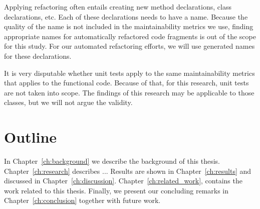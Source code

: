 Applying refactoring often entails creating new method declarations, class declarations, etc. Each of these declarations needs to have a name. Because the quality of the name is not included in the maintainability metrics we use, finding appropriate names for automatically refactored code fragments is out of the scope for this study. For our automated refactoring efforts, we will use generated names for these declarations.

It is very disputable whether unit tests apply to the same maintainability metrics that applies to the functional code. Because of that, for this research, unit tests are not taken into scope. The findings of this research may be applicable to those classes, but we will not argue the validity.

\section{Outline}
In Chapter~\ref{ch:background} we describe the background of this thesis.
Chapter~\ref{ch:research} describes ...
Results are shown in Chapter~\ref{ch:results} and discussed in Chapter~\ref{ch:discussion}. Chapter~\ref{ch:related_work}, contains the work related to this thesis.
Finally, we present our concluding remarks in Chapter~\ref{ch:conclusion} together with future work.
